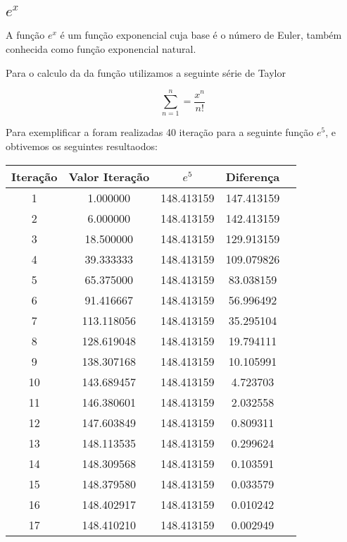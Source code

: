 \subsection{$e^x$}

	A função $e^x$ é um função exponencial cuja base é o número de Euler,
	também conhecida como função exponencial natural.

	Para o calculo da da função utilizamos a seguinte série de Taylor
	
	\begin{equation}
		\sum_{n=1}^{n} = \frac{x^n}{n!}
	\end{equation}

	Para exemplificar a foram realizadas 40 iteração para a seguinte função $e^5$, e obtivemos os seguintes resultaodos:

\begin{table}[H]
	\centering
	\begin{tabular}{|c|c|c|c|c|}
    	\hline
		Iteração & Valor Iteração & $e^5$ & Diferença \\
		\hline
		1 & 1.000000 & 148.413159 & 147.413159\\
		\hline
		2 & 6.000000 & 148.413159 & 142.413159\\
		\hline
		3 & 18.500000 & 148.413159 & 129.913159\\
		\hline
		4 & 39.333333 & 148.413159 & 109.079826\\
		\hline
		5 & 65.375000 & 148.413159 & 83.038159\\
		\hline
		6 & 91.416667 & 148.413159 & 56.996492\\
		\hline
		7 & 113.118056 & 148.413159 & 35.295104\\
		\hline
		8 & 128.619048 & 148.413159 & 19.794111\\
		\hline
		9 & 138.307168 & 148.413159 & 10.105991\\
		\hline
		10 & 143.689457 & 148.413159 & 4.723703\\
		\hline
		11 & 146.380601 & 148.413159 & 2.032558\\
		\hline
		12 & 147.603849 & 148.413159 & 0.809311\\
		\hline
		13 & 148.113535 & 148.413159 & 0.299624\\
		\hline
		14 & 148.309568 & 148.413159 & 0.103591\\
		\hline
		15 & 148.379580 & 148.413159 & 0.033579\\
		\hline
		16 & 148.402917 & 148.413159 & 0.010242\\
		\hline
		17 & 148.410210 & 148.413159 & 0.002949\\

\end{tabular}
\end{table}

